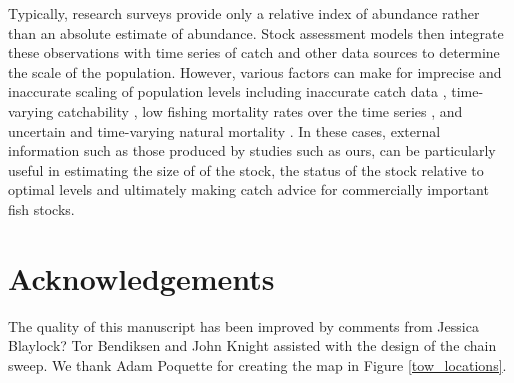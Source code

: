 \documentclass[
  12pt,
]{article}
\newlength{\cslhangindent}
\newlength{\cslentryspacingunit} %
\newenvironment{CSLReferences}[2] %
 {%
  \setlength{\parindent}{0pt}
  \ifodd #1
  \let\oldpar\par
  \def\par{\hangindent=\cslhangindent\oldpar}
  \fi
  \setlength{\parskip}{#2\cslentryspacingunit}
 }%
 {}
\begin{document}
Typically, research surveys provide only a relative index of abundance
rather than an absolute estimate of abundance. Stock assessment models
then integrate these observations with time series of catch and other
data sources to determine the scale of the population. However, various
factors can make for imprecise and inaccurate scaling of population
levels including inaccurate catch data \citep{cadigan16}, time-varying
catchability \citep{wilbergetal09}, low fishing mortality rates over the
time series \citep{adamsetal14}, and uncertain and time-varying natural
mortality \citep{stocketal21}. In these cases, external information such
as those produced by studies such as ours, can be particularly useful in
estimating the size of of the stock, the status of the stock relative to
optimal levels and ultimately making catch advice for commercially
important fish stocks.

\hypertarget{acknowledgements}{%
\section*{Acknowledgements}\label{acknowledgements}}

The quality of this manuscript has been improved by comments from
Jessica Blaylock? Tor Bendiksen and John Knight assisted with the design
of the chain sweep. We thank Adam Poquette for creating the map in
Figure \ref{tow_locations}.

\pagebreak



\hypertarget{refs}{}
\begin{CSLReferences}{0}{0}
\end{CSLReferences}

\pagebreak
\end{document}
